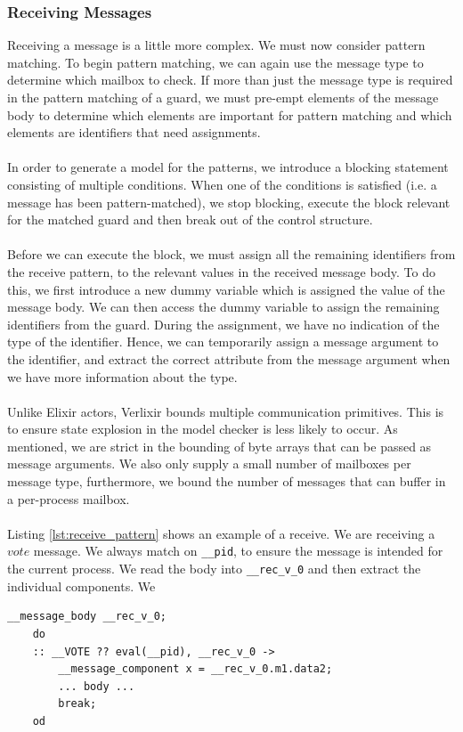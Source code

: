 \subsubsection{Receiving Messages}
Receiving a message is a little more complex. We must now consider pattern matching. To begin pattern matching, we can again use the message type to determine which mailbox to check. If more than just the message type is required in the pattern matching of a guard, we must pre-empt elements of the message body to determine which elements are important for pattern matching and which elements are identifiers that need assignments. 
\\ \\
In order to generate a model for the patterns, we introduce a blocking statement consisting of multiple conditions. When one of the conditions is satisfied (i.e. a message has been pattern-matched), we stop blocking, execute the block relevant for the matched guard and then break out of the control structure. 
\\ \\
Before we can execute the block, we must assign all the remaining identifiers from the receive pattern, to the relevant values in the received message body. To do this, we first introduce a new dummy variable which is assigned the value of the message body. We can then access the dummy variable to assign the remaining identifiers from the guard. During the assignment, we have no indication of the type of the identifier. Hence, we can temporarily assign a message argument to the identifier, and extract the correct attribute from the message argument when we have more information about the type.
\\ \\
Unlike Elixir actors, Verlixir bounds multiple communication primitives. This is to ensure state explosion in the model checker is less likely to occur. As mentioned, we are strict in the bounding of byte arrays that can be passed as message arguments. We also only supply a small number of mailboxes per message type, furthermore, we bound the number of messages that can buffer in a per-process mailbox.
\\ \\
Listing \ref{lst:receive_pattern} shows an example of a receive. We are receiving a $vote$ message. We always match on \texttt{\_\_pid}, to ensure the message is intended for the current process. We read the body into \texttt{\_\_rec\_v\_0} and then extract the individual components. We 
\begin{lstlisting}[language=Promela, caption={Example of a receive pattern. Translation of \texttt{\{:vote, x\}.}}, label={lst:receive_pattern}, xleftmargin=.4\linewidth]
    __message_body __rec_v_0;
    do
    :: __VOTE ?? eval(__pid), __rec_v_0 ->
        __message_component x = __rec_v_0.m1.data2;
        ... body ...
        break;
    od
\end{lstlisting}
